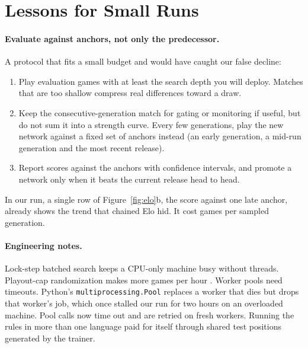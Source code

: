 \section{Lessons for Small Runs}
\label{sec:lessons}
\paragraph{Evaluate against anchors, not only the predecessor.}
A protocol that fits a small budget and would have caught our false decline:
\begin{enumerate}
  \item Play evaluation games with at least the search depth you will deploy. Matches that are too
        shallow compress real differences toward a draw.
  \item Keep the consecutive-generation match for gating or monitoring if useful, but do not sum it into
        a strength curve. Every few generations, play the new network against a fixed set of anchors
        instead (an early generation, a mid-run generation and the most recent release).
  \item Report scores against the anchors with confidence intervals, and promote a network only when it
        beats the current release head to head.
\end{enumerate}
In our run, a single row of Figure~\ref{fig:elo}b, the score against one late anchor, already shows the trend
that chained Elo hid. It cost \valEvalGames{} games per sampled generation.

\paragraph{Engineering notes.}
Lock-step batched search keeps a CPU-only machine busy without threads. Playout-cap randomization makes
more games per hour \citep{wu2019katago}. Worker pools need timeouts. Python's \texttt{multiprocessing.Pool}
replaces a worker that dies but drops that worker's job, which once stalled our run for two hours on an
overloaded machine. Pool calls now time out and are retried on fresh workers. Running the rules in more
than one language paid for itself through shared test positions generated by the trainer.
